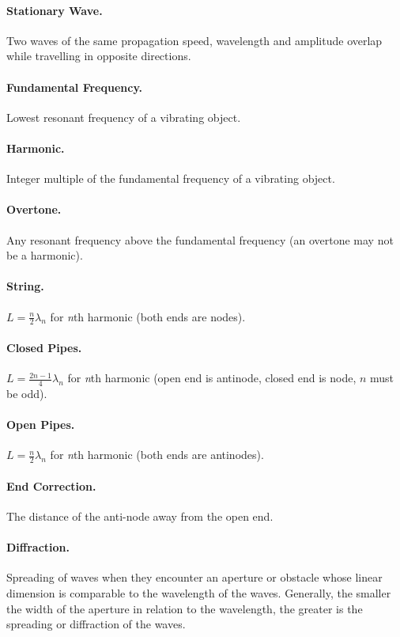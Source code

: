\documentclass{article}
\begin{document}
\paragraph{Stationary Wave.} Two waves of the same propagation speed, wavelength and amplitude overlap while travelling in opposite directions.

\paragraph{Fundamental Frequency.} Lowest resonant frequency of a vibrating object.

\paragraph{Harmonic.} Integer multiple of the fundamental frequency of a vibrating object.

\paragraph{Overtone.} Any resonant frequency above the fundamental frequency (an overtone may not be a harmonic).

\paragraph{String.} $L = \frac{n}{2} \lambda_n$ for \textit{n}th harmonic (both ends are nodes).

\paragraph{Closed Pipes.} $L = \frac{2n - 1}{4} \lambda_n$ for \textit{n}th harmonic (open end is antinode, closed end is node, $n$ must be odd).

\paragraph{Open Pipes.} $L = \frac{n}{2} \lambda_n$ for \textit{n}th harmonic (both ends are antinodes).

\paragraph{End Correction.} The distance of the anti-node away from the open end.

\paragraph{Diffraction.} Spreading of waves when they encounter an aperture or obstacle whose linear dimension is comparable to the wavelength of the waves. Generally, the smaller the width of the aperture in relation to the wavelength, the greater is the spreading or diffraction of the waves.
\end{document}
